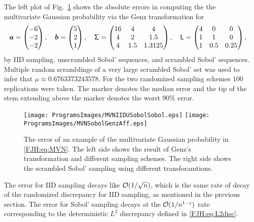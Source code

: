 \documentclass[graybox,footinfo]{svmult}
\begin{document}
The left plot of Fig.\ \ref{FJH:fig:MVNfig} shows the absolute errors in computing the the 
multivariate 
Gaussian probability via the Genz transformation for 
\[
   {\boldsymbol{a}}  = \begin{pmatrix}
   -6 \\ -2 \\ -2
   \end{pmatrix}, \quad
      {\boldsymbol{b}}  = \begin{pmatrix}
   5 \\ 2 \\ 1
   \end{pmatrix}, \quad
   \mathsf{\Sigma} = \begin{pmatrix} 16 & 4 & 4 \\ 4 &  2 &  1.5 \\
  4 & 1.5 &  1.3125 \end{pmatrix}, \quad
   \mathsf{L} = \begin{pmatrix} 4 & 0 & 0 \\ 1 &  1 &  0 \\
1 & 0.5 &  0.25 \end{pmatrix}, 
\]
by IID sampling, unscrambled Sobol' sequences, and scrambled Sobol' sequences.   
Multiple random scramblings of a very large scrambled Sobol' set was used to infer that 
$\mu \approx 0.6763373243578$.   For the two randomized sampling schemes $100$ 
replications were taken.  The marker denotes the median error and the tip of the stem 
extending above the marker denotes the worst $90\%$ error.

\begin{figure}
	\centering
	\texttt{[image: ProgramsImages/MVNIIDUSobolSobol.eps]} 
	\qquad 
	\texttt{[image: ProgramsImages/MVNSobolGenzAff.eps]}
	\caption{The error of an example of the multivariate Gaussian probability in 
	\eqref{FJH:eq:MVN}.  The left side shows the result of Genz's transformation and 
	different sampling schemes.  The right side shows the scrambled Sobol' sampling 
	using different transforamtions.
	\label{FJH:fig:MVNfig}}
\end{figure}

The error for IID sampling decays like $\mathcal{O}(1/\sqrt{n})$, which is the same rate of 
decay of the randomized discrepancy for IID sampling, as mentioned in the previous 
section.  The error for  Sobol' sampling 
decays at the $\mathcal{O}(1/n^{1-\epsilon})$ rate corresponding to the deterministic $L^2$
discrepancy defined in \eqref{FJH:eq:L2disc}.  
\end{document}

